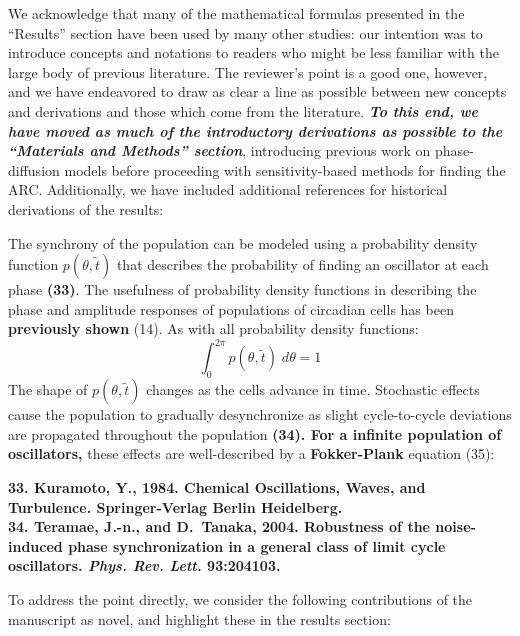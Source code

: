 \documentclass[11pt, letterpaper]{article}
\newenvironment{manuscript}[1]{\begin{center}\begin{tcolorbox}[colback=green!5!white,colframe=green!75!black,width=0.8\textwidth,title={#1},breakable,fonttitle=\bfseries]}{\end{tcolorbox}\end{center}}
\begin{document}
We acknowledge that many of the mathematical formulas presented in the ``Results'' section have been used by many other studies: our intention was to introduce concepts and notations to readers who might be less familiar with the large body of previous literature.
The reviewer's point is a good one, however, and we have endeavored to draw as clear a line as possible between new concepts and derivations and those which come from the literature.
{\itshape\bfseries To this end, we have moved as much of the introductory derivations as possible to the ``Materials and Methods'' section}, introducing previous work on phase-diffusion models before proceeding with sensitivity-based methods for finding the ARC.
Additionally, we have included additional references for historical derivations of the results:
\begin{manuscript}{Pages 5-6}
  The synchrony of the population can be modeled using a probability density function $p(\theta, \tilde{t})$ that describes the probability of finding an oscillator at each phase {\bfseries (33)}.
The usefulness of probability density functions in describing the phase and amplitude responses of populations of circadian cells has been {\bfseries previously shown} (14).
As with all probability density functions:
\begin{equation}
  \int_0^{2\pi} p(\theta, \tilde{t}) \; d\theta = 1
  \tag{12}
\end{equation}
The shape of $p(\theta, \tilde{t})$ changes as the cells advance in time.
Stochastic effects cause the population to gradually desynchronize as slight cycle-to-cycle deviations are propagated throughout the population {\bfseries (34). For a infinite population of oscillators,} these effects are well-described by a {\bfseries Fokker-Plank} equation (35):
\end{manuscript}

\begin{manuscript}{Page 21}
\bfseries
33. Kuramoto, Y., 1984. Chemical Oscillations, Waves, and Turbulence. Springer-Verlag Berlin
Heidelberg.\\
34. Teramae, J.-n., and D.~Tanaka, 2004. {Robustness of the noise-induced phase synchronization in a general
  class of limit cycle oscillators.} \emph{Phys. Rev. Lett.} 93:204103.
\end{manuscript}

To address the point directly, we consider the following contributions of the manuscript as novel, and highlight these in the results section:
\end{document}
